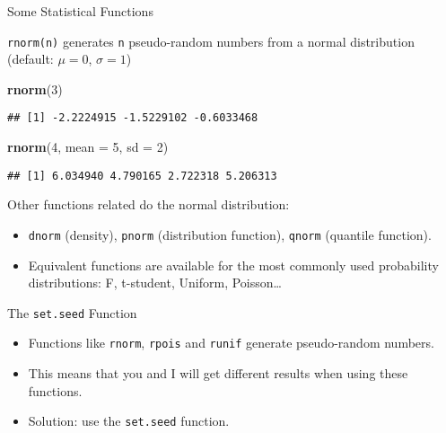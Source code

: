 \documentclass[ignorenonframetext,]{beamer}
\newenvironment{Shaded}{\begin{snugshade}}{\end{snugshade}}
\newcommand{\DataTypeTok}[1]{\textcolor[rgb]{0.13,0.29,0.53}{#1}}
\newcommand{\DecValTok}[1]{\textcolor[rgb]{0.00,0.00,0.81}{#1}}
\newcommand{\KeywordTok}[1]{\textcolor[rgb]{0.13,0.29,0.53}{\textbf{#1}}}
\newcommand{\NormalTok}[1]{#1}
\begin{document}
\begin{frame}[fragile]{Some Statistical Functions}
\protect\hypertarget{some-statistical-functions}{}

\texttt{rnorm(n)} generates \texttt{n} pseudo-random numbers from a
normal distribution (default: \(\mu = 0\), \(\sigma = 1\))

\begin{Shaded}
\begin{Highlighting}[]
\KeywordTok{rnorm}\NormalTok{(}\DecValTok{3}\NormalTok{)}
\end{Highlighting}
\end{Shaded}

\begin{verbatim}
## [1] -2.2224915 -1.5229102 -0.6033468
\end{verbatim}

\begin{Shaded}
\begin{Highlighting}[]
\KeywordTok{rnorm}\NormalTok{(}\DecValTok{4}\NormalTok{, }\DataTypeTok{mean =}  \DecValTok{5}\NormalTok{, }\DataTypeTok{sd =} \DecValTok{2}\NormalTok{)}
\end{Highlighting}
\end{Shaded}

\begin{verbatim}
## [1] 6.034940 4.790165 2.722318 5.206313
\end{verbatim}

Other functions related do the normal distribution:

\begin{itemize}
\item
  \texttt{dnorm} (density), \texttt{pnorm} (distribution function),
  \texttt{qnorm} (quantile function).
\item
  Equivalent functions are available for the most commonly used
  probability distributions: F, t-student, Uniform, Poisson\ldots{}
\end{itemize}

\end{frame}

\begin{frame}[fragile]{The \texttt{set.seed} Function}
\protect\hypertarget{the-set.seed-function}{}

\begin{itemize}
\item
  Functions like \texttt{rnorm}, \texttt{rpois} and \texttt{runif}
  generate pseudo-random numbers.
\item
  This means that you and I will get different results when using these
  functions.
\item
  Solution: use the \texttt{set.seed} function.
\end{itemize}

\end{frame}
\end{document}
